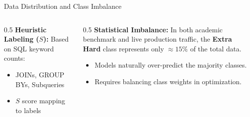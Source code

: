 \documentclass[9pt]{beamer}
\begin{document}
\begin{frame}{Data Distribution and Class Imbalance}
    \vspace{0.45cm}
    \begin{columns}[t]
        \begin{column}{0.5\textwidth}
            \textbf{Heuristic Labeling ($S$):}
            Based on SQL keyword counts:
            \begin{itemize}
                \scriptsize
                \item JOINs, GROUP BYs, Subqueries
                \item $S$ score mapping to labels
            \end{itemize}
        \end{column}
        
        \begin{column}{0.5\textwidth}
            \textbf{Statistical Imbalance:}
            In both academic benchmark and live production traffic, the \textbf{Extra Hard} class represents only $\approx 15\%$ of the total data. 
            \begin{itemize}
                \scriptsize
                \item Models naturally over-predict the majority classes.
                \item Requires balancing class weights in optimization.
            \end{itemize}
        \end{column}
    \end{columns}
\end{frame}
%
%
%
%
\end{document}
